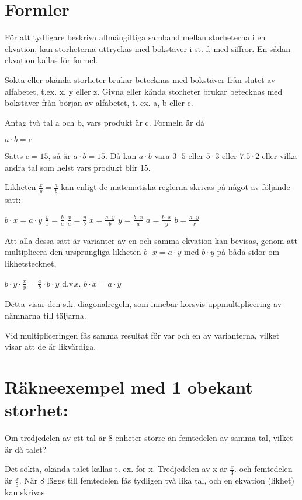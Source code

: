 \section{Formler}
För att tydligare beskriva allmängiltiga samband mellan storheterna i en
ekvation, kan storheterna uttryckas med bokstäver i st. f. med siffror. En sådan
ekvation kallas för formel.

Sökta eller okända storheter brukar betecknas med bokstäver från slutet av
alfabetet, t.ex. x, y eller z. Givna eller kända storheter brukar betecknas med
bokstäver från början av alfabetet, t. ex. a, b eller c.

Antag två tal a och b, vars produkt är c.
Formeln är då

$a \cdot b = c$

Sätts $c = 15$, så är $a \cdot b = 15$. Då kan $a \cdot b$ vara $3 \cdot 5$
eller $5 \cdot 3$ eller $7.5 \cdot 2$ eller vilka andra tal som helst vars
produkt blir 15.

Likheten $\frac{x}{y} = \frac{a}{b}$ kan enligt de matematiska reglerna skrivas
på något av följande sätt:

$b \cdot x = a \cdot y$ $\frac{y}{x} = \frac{b}{a}$ $\frac{x}{a} = \frac{y}{b}$ $x = \frac{a \cdot y}{b}$
$y = \frac{b \cdot x}{a}$ $a = \frac{b \cdot x}{y}$ $b = \frac{a \cdot y}{x}$

Att alla dessa sätt är varianter av en och samma ekvation kan bevisas, genom att
multiplicera den ursprungliga likheten $b \cdot x = a \cdot y$ med $b \cdot y$
på båda sidor om likhetstecknet,

$b \cdot y \cdot \frac{x}{y} = \frac{a}{b} \cdot b \cdot y$ d.v.s. $b \cdot x = a \cdot y$

Detta visar den s.k. diagonalregeln, som innebär korsvis uppmultiplicering av
nämnarna till täljarna.

Vid multipliceringen fås samma resultat för var och en av varianterna, vilket
visar att de är likvärdiga.

\section{Räkneexempel med 1 obekant storhet:}
Om tredjedelen av ett tal är 8 enheter större än femtedelen av samma tal, vilket
är då talet?

Det sökta, okända talet kallas t. ex. för x. Tredjedelen av x är $\frac{x}{3}$. och femtedelen är $\frac{x}{5}$.
När 8 läggs till femtedelen fås tydligen två lika tal, och en ekvation (likhet)
kan skrivas

